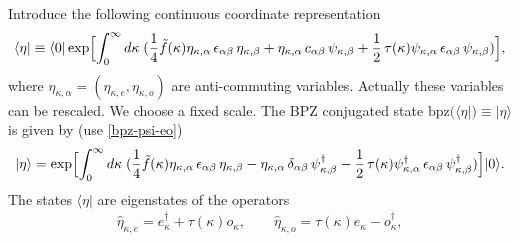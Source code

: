 \documentclass[a4paper,12pt]{article}
\begin{document}
Introduce the following continuous coordinate representation
\begin{gather}
\langle \eta|\equiv\langle 0|\exp\Bigl[\int_{0}^{\infty}d\kappa\;
(\frac14 \tilde{f}(\kappa)\eta_{\kappa,\alpha}\,\epsilon_{\alpha\beta}\,
\eta_{\kappa,\beta}
+\eta_{\kappa,\alpha}\,c_{\alpha\beta}\,
\psi_{\kappa,\beta}
+\frac12\,\tau(\kappa)\psi_{\kappa,\alpha}\,\epsilon_{\alpha\beta}\,
\psi_{\kappa,\beta}
)\Bigr],\label{coor-eta}
\end{gather}
where $\eta_{\kappa,\alpha}=(\eta_{\kappa,e},\eta_{\kappa,o})$
are anti-commuting variables.
Actually these variables can be rescaled.
We choose a fixed scale. The BPZ
conjugated state $\text{bpz}(\langle\eta|)\equiv|\eta\rangle$ is given
by (use \eqref{bpz-psi-eo})
\begin{gather}
|\eta\rangle=\exp\Bigl[ \int_{0}^{\infty}d\kappa\;
(\frac14 \tilde{f}(\kappa)\eta_{\kappa,\alpha}\,\epsilon_{\alpha\beta}\,
\eta_{\kappa,\beta}
-\eta_{\kappa,\alpha}\,\delta_{\alpha\beta}\,
\psi^{\dag}_{\kappa,\beta}
-\frac12\,\tau(\kappa)\psi_{\kappa,\alpha}^{\dag}\,\epsilon_{\alpha\beta}\,
\psi_{\kappa,\beta}^{\dag})
\Bigr]|0\rangle.
\label{coor-repr-right}
\end{gather}
The states $\langle\eta|$ are eigenstates of the operators
\begin{subequations}
\begin{gather}
\hat{\eta}_{\kappa,e}
=e^{\dag}_{\kappa}+\tau(\kappa)o_{\kappa},\qquad
\hat{\eta}_{\kappa,o}
=\tau(\kappa) e_{\kappa}-o^{\dag}_{\kappa},
\end{gather}
\end{subequations}
\end{document}
